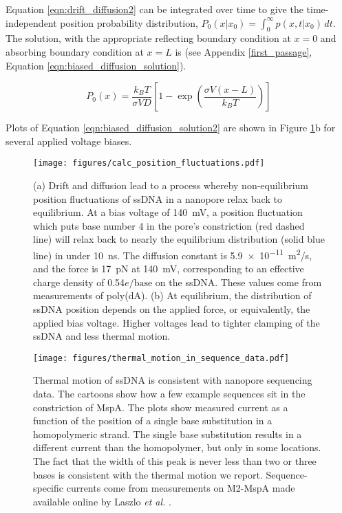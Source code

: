 Equation \ref{eqn:drift_diffusion2} can be integrated over time to give the time-independent position probability distribution, $P_0(x|x_0) = \int_0^{\infty} p(x,t|x_0) \, dt$.  The solution, with the appropriate reflecting boundary condition at $x=0$ and absorbing boundary condition at $x=L$ is (see Appendix \ref{first_passage}, Equation \ref{eqn:biased_diffusion_solution}).

\begin{equation}
P_0(x) = \frac{k_B T}{\sigma V D} \left[ 1 - \exp{ \left( \frac{\sigma V (x-L)}{k_B T} \right) } \right]
\label{eqn:biased_diffusion_solution2}
\end{equation}

Plots of Equation \ref{eqn:biased_diffusion_solution2} are shown in Figure \ref{fig:position_fluctuations}b for several applied voltage biases.

\begin{figure}[h]
\begin{centering}
\texttt{[image: figures/calc\_position\_fluctuations.pdf]}
\caption[Position fluctuations of ssDNA in MspA]{(a) Drift and diffusion lead to a process whereby non-equilibrium position fluctuations of ssDNA in a nanopore relax back to equilibrium.  At a bias voltage of \SI{140}{\mV}, a position fluctuation which puts base number 4 in the pore's constriction (red dashed line) will relax back to nearly the equilibrium distribution (solid blue line) in under \SI{10}{\ns}.  The diffusion constant is \SI{5.9e-11}{\m^2/s}, and the force is \SI{17}{\pico\N} at \SI{140}{\mV}, corresponding to an effective charge density of \num{0.54}$e/\text{base}$ on the ssDNA.  These values come from measurements of poly(dA).  (b) At equilibrium, the distribution of ssDNA position depends on the applied force, or equivalently, the applied bias voltage.  Higher voltages lead to tighter clamping of the ssDNA and less thermal motion.}
\label{fig:position_fluctuations}
\end{centering}
\end{figure}

\begin{figure}[h]
\begin{centering}
\texttt{[image: figures/thermal\_motion\_in\_sequence\_data.pdf]}
\caption[Thermal motion averaging and sequencing data]{Thermal motion of ssDNA is consistent with nanopore sequencing data.  The cartoons show how a few example sequences sit in the constriction of MspA.  The plots show measured current as a function of the position of a single base substitution in a homopolymeric strand.  The single base substitution results in a different current than the homopolymer, but only in some locations.  The fact that the width of this peak is never less than two or three bases is consistent with the thermal motion we report.  Sequence-specific currents come from measurements on M2-MspA made available online by Laszlo \textit{et al.} \citep{Laszlo2014}.}
\label{fig:thermal_motion_sequencing}
\end{centering}
\end{figure}

